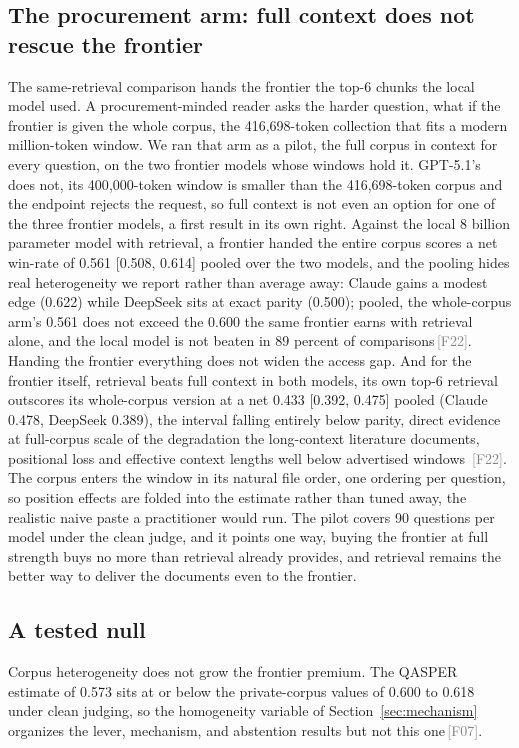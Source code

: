 \documentclass[11pt]{article}
\newcommand{\rcpt}[1]{\textcolor{gray}{\,\textsf{\scriptsize[#1]}}}
\begin{document}
\subsection{The procurement arm: full context does not rescue the frontier}
\label{sec:procurement}
The same-retrieval comparison hands the frontier the top-6 chunks the local model used. A procurement-minded reader asks the harder question, what if the frontier is given the whole corpus, the 416,698-token collection that fits a modern million-token window. We ran that arm as a pilot, the full corpus in context for every question, on the two frontier models whose windows hold it. GPT-5.1's does not, its 400{,}000-token window is smaller than the 416{,}698-token corpus and the endpoint rejects the request, so full context is not even an option for one of the three frontier models, a first result in its own right. Against the local 8 billion parameter model with retrieval, a frontier handed the entire corpus scores a net win-rate of 0.561 [0.508, 0.614] pooled over the two models, and the pooling hides real heterogeneity we report rather than average away: Claude gains a modest edge (0.622) while DeepSeek sits at exact parity (0.500); pooled, the whole-corpus arm's 0.561 does not exceed the 0.600 the same frontier earns with retrieval alone, and the local model is not beaten in 89 percent of comparisons\rcpt{F22}. Handing the frontier everything does not widen the access gap. And for the frontier itself, retrieval beats full context in both models, its own top-6 retrieval outscores its whole-corpus version at a net 0.433 [0.392, 0.475] pooled (Claude 0.478, DeepSeek 0.389), the interval falling entirely below parity, direct evidence at full-corpus scale of the degradation the long-context literature documents, positional loss \citep{liu2024lost} and effective context lengths well below advertised windows \citep{hsieh2024ruler}\rcpt{F22}. The corpus enters the window in its natural file order, one ordering per question, so position effects are folded into the estimate rather than tuned away, the realistic naive paste a practitioner would run. The pilot covers 90 questions per model under the clean judge, and it points one way, buying the frontier at full strength buys no more than retrieval already provides, and retrieval remains the better way to deliver the documents even to the frontier.

\subsection{A tested null}
Corpus heterogeneity does not grow the frontier premium. The QASPER estimate of 0.573 sits at or below the private-corpus values of 0.600 to 0.618 under clean judging, so the homogeneity variable of Section~\ref{sec:mechanism} organizes the lever, mechanism, and abstention results but not this one\rcpt{F07}.
\end{document}
